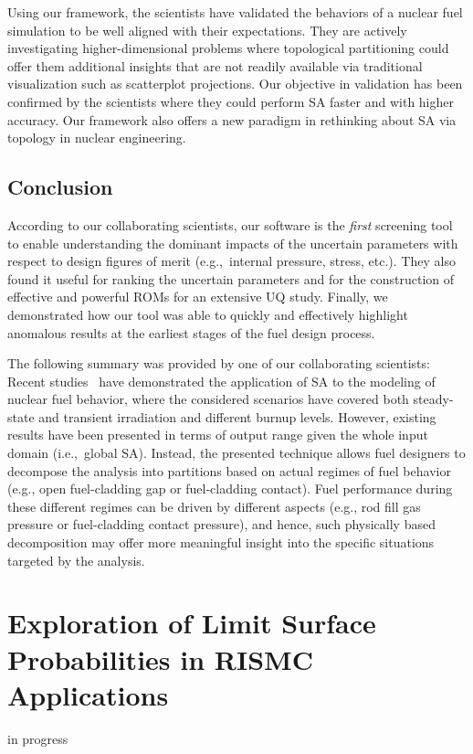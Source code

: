Using our framework, the scientists have validated the behaviors of a nuclear fuel simulation to be well aligned with their expectations.
%
They are actively investigating higher-dimensional problems where topological partitioning could offer them additional insights that are not readily available via traditional visualization such as scatterplot projections.
%
Our objective in validation has been confirmed by the scientists where they could perform SA faster and with higher accuracy.
%
Our framework also offers a new paradigm in rethinking about SA via topology in nuclear engineering.

\subsection{Conclusion}
According to our collaborating scientists, our software is the \emph{first} screening tool to enable understanding the dominant impacts of the uncertain parameters with respect to design figures of merit (e.g.,\ internal pressure, stress, etc.).
%
They also found it useful for ranking the uncertain parameters and for the construction of effective and powerful ROMs for an extensive UQ study.
%
Finally, we demonstrated how our tool was able to quickly and effectively highlight anomalous results at the earliest stages of the fuel design process.

The following summary was provided by one of our collaborating scientists: Recent studies~\cite{BouloreStruzikGaudier2012,IkonenTulkki2014,PastoreSwilerHales2015} have demonstrated the application of SA to the modeling of nuclear fuel behavior, where the considered scenarios have covered both steady-state and transient irradiation and different burnup levels.
%
However, existing results have been presented in terms of output range given the whole input domain (i.e.,\ global SA).
%
Instead, the presented technique allows fuel designers to decompose the analysis into partitions based on actual regimes of fuel behavior (e.g., open fuel-cladding gap or fuel-cladding contact).
%
Fuel performance during these different regimes can be driven by different aspects (e.g., rod fill gas pressure or fuel-cladding contact pressure), and hence, such physically based decomposition may offer more meaningful insight into the specific situations targeted by the analysis.

\section{Exploration of Limit Surface Probabilities in RISMC Applications}
  in progress

% 